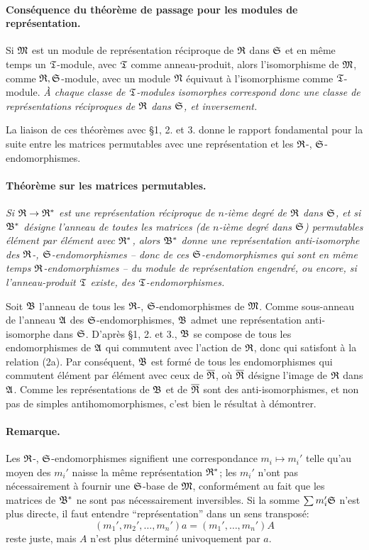 \paragraph{Conséquence du théorème de passage pour les modules de représentation.}
Si \(\mathfrak M\) est un module de représentation réciproque de \(\mathfrak R\) dans \(\mathfrak S\) et en même temps un \(\mathfrak T\)-module, avec \(\mathfrak T\) comme anneau-produit, alors l'isomorphisme de \(\mathfrak M\), comme \(\mathfrak R,\mathfrak S\)-module, avec un module \(\mathfrak N\) équivaut à l'isomorphisme comme \(\mathfrak T\)-module. \emph{À chaque classe de \(\mathfrak T\)-modules isomorphes correspond donc une classe de représentations réciproques de \(\mathfrak R\) dans \(\mathfrak S\), et inversement.}

La liaison de ces théorèmes avec \S 1, 2. et 3. donne le rapport fondamental pour la suite entre les matrices permutables avec une représentation et les \(\mathfrak R\)-, \(\mathfrak S\)-endomorphismes.

\paragraph{Théorème sur les matrices permutables.}
\emph{Si \(\mathfrak R\to\mathfrak R^*\) est une représentation réciproque de \(n\)-ième degré de \(\mathfrak R\) dans \(\mathfrak S\), et si \(\mathfrak B^*\) désigne l'anneau de toutes les matrices (de \(n\)-ième degré dans \(\mathfrak S\)) permutables élément par élément avec \(\mathfrak R^*\), alors \(\mathfrak B^*\) donne une représentation anti-isomorphe des \(\mathfrak R\)-, \(\mathfrak S\)-endomorphismes -- donc de ces \(\mathfrak S\)-endomorphismes qui sont en même temps \(\mathfrak R\)-endomorphismes -- du module de représentation engendré, ou encore, si l'anneau-produit \(\mathfrak T\) existe, des \(\mathfrak T\)-endomorphismes.}

Soit \(\mathfrak B\) l'anneau de tous les \(\mathfrak R\)-, \(\mathfrak S\)-endomorphismes de \(\mathfrak M\). Comme sous-anneau de l'anneau \(\mathfrak A\) des \(\mathfrak S\)-endomorphismes, \(\mathfrak B\) admet une représentation anti-isomorphe dans \(\mathfrak S\). D'après \S 1, 2. et 3., \(\mathfrak B\) se compose de tous les endomorphismes de \(\mathfrak A\) qui commutent avec l'action de \(\mathfrak R\), donc qui satisfont à la relation (2a). Par conséquent, \(\mathfrak B\) est formé de tous les endomorphismes qui commutent élément par élément avec ceux de \(\overline{\mathfrak R}\), où \(\overline{\mathfrak R}\) désigne l'image de \(\mathfrak R\) dans \(\mathfrak A\). Comme les représentations de \(\mathfrak B\) et de \(\overline{\mathfrak R}\) sont des anti-isomorphismes, et non pas de simples antihomomorphismes, c'est bien le résultat à démontrer.

\paragraph{Remarque.}
Les \(\mathfrak R\)-, \(\mathfrak S\)-endomorphismes signifient une correspondance \(m_i\mapsto m_i'\) telle qu'au moyen des \(m_i'\) naisse la même représentation \(\mathfrak R^*\); les \(m_i'\) n'ont pas nécessairement à fournir une \(\mathfrak S\)-base de \(\mathfrak M\), conformément au fait que les matrices de \(\mathfrak B^*\) ne sont pas nécessairement inversibles. Si la somme \(\sum m_i'\mathfrak S\) n'est plus directe, il faut entendre ``représentation'' dans un sens transposé:
\[
        (m_1',m_2',\ldots,m_n')a=(m_1',\ldots,m_n')A
\]
reste juste, mais \(A\) n'est plus déterminé univoquement par \(a\).

